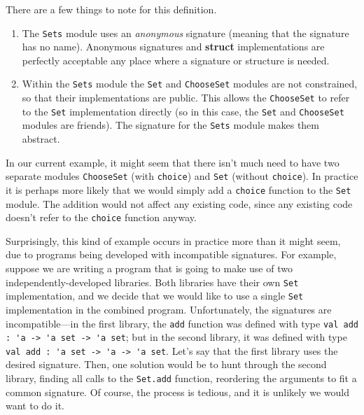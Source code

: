 There are a few things to note for this definition.

\begin{enumerate}
\item{}

The \hbox{\lstinline/Sets/} module uses an \emph{anonymous} signature
(meaning that the signature has no name). Anonymous signatures
and \textbf{struct} implementations are perfectly acceptable any place
where a signature or structure is needed.

\item{}

Within the \hbox{\lstinline/Sets/} module the \hbox{\lstinline/Set/}
and \hbox{\lstinline/ChooseSet/} modules are not constrained, so that
their implementations are public. This allows
the \hbox{\lstinline/ChooseSet/} to refer to
the \hbox{\lstinline/Set/} implementation directly (so in this case,
the \hbox{\lstinline/Set/} and \hbox{\lstinline/ChooseSet/} modules
are friends). The signature for the \hbox{\lstinline/Sets/} module
makes them abstract.

\end{enumerate}


In our current example, it might seem that there isn't much need to
have two separate modules \hbox{\lstinline/ChooseSet/}
(with \hbox{\lstinline/choice/}) and \hbox{\lstinline/Set/}
(without \hbox{\lstinline/choice/}). In practice it is perhaps more
likely that we would simply add a \hbox{\lstinline/choice/} function
to the \hbox{\lstinline/Set/} module. The addition would not affect
any existing code, since any existing code doesn't refer to
the \hbox{\lstinline/choice/} function anyway.

Surprisingly, this kind of example occurs in practice more than it
might seem, due to programs being developed with incompatible
signatures. For example, suppose we are writing a program that is
going to make use of two independently-developed libraries. Both
libraries have their own \hbox{\lstinline/Set/} implementation, and we
decide that we would like to use a single \hbox{\lstinline/Set/}
implementation in the combined program. Unfortunately, the signatures
are incompatible---in the first library, the \hbox{\lstinline/add/}
function was defined with type
\hbox{\lstinline/val add : 'a -> 'a set -> 'a set/};
but in the second library, it was defined with
type \hbox{\lstinline/val add : 'a set -> 'a -> 'a set/}. Let's say
that the first library uses the desired signature. Then, one solution
would be to hunt through the second library, finding all calls to
the \hbox{\lstinline/Set.add/} function, reordering the arguments to
fit a common signature. Of course, the process is tedious, and it is
unlikely we would want to do it.

